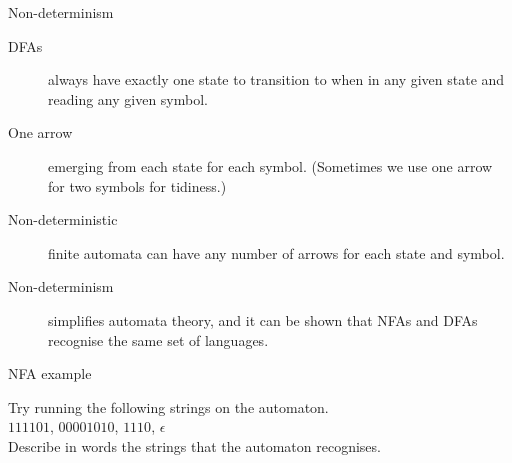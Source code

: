 
\begin{frame}{Non-determinism}
  \begin{description}
    \item[DFAs] always have exactly one state to transition to when in any given state and reading any given symbol.
    \vspace{4mm}
    \item[One arrow] emerging from each state for each symbol. (Sometimes we use one arrow for two symbols for tidiness.)
    \vspace{4mm}
    \item[Non-deterministic] finite automata can have any number of arrows for each state and symbol.
    \vspace{4mm}
    \item[Non-determinism] simplifies automata theory, and it can be shown that NFAs and DFAs recognise the same set of languages.
  \end{description}
\end{frame}


\begin{frame}[fragile]{NFA example}
  \begin{center}
  \end{center}
  \begin{center}
    Try running the following strings on the automaton. \\
    $111101$, $00001010$, $1110$, $\epsilon$ \\
    Describe in words the strings that the automaton recognises.
  \end{center}
\end{frame}


